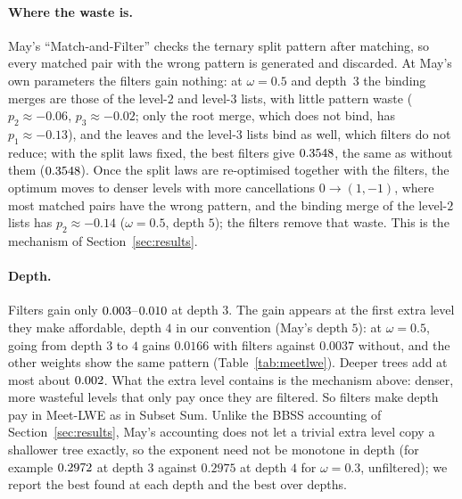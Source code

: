 \begin{table}[ht]
\centering\small
\setlength{\tabcolsep}{4pt}
\caption{Meet-LWE (Rep-1) time exponents $\log_2(T)/n$, asymptotic, guessing ignored. ``May'' is~\cite[Table~5]{May21};
``May, re-opt.'' is his Rep-1 formulas re-optimised over his depths $4$--$6$. The columns $d=3$ and $d=4$ give our best
points found at that depth, unfiltered / filtered; the last columns give the best found over $d=3,\dots,7$, with the
smallest depth attaining it. The gain is unfiltered minus filtered, both best over depths.}
\label{tab:meetlwe}
\end{table}

\paragraph{Where the waste is.} May's ``Match-and-Filter'' checks the ternary split pattern after matching, so every
matched pair with the wrong pattern is generated and discarded. At May's own parameters the filters gain nothing: at
$\omega=0.5$ and depth~$3$ the binding merges are those of the level-$2$ and level-$3$ lists, with little pattern
waste ($p_2\approx-0.06$, $p_3\approx-0.02$; only the root merge, which does not bind, has $p_1\approx-0.13$), and the
leaves and the level-$3$ lists bind as well, which filters do not reduce; with the split laws fixed, the best filters give
$0.3548$, the same as without them ($0.3548$). Once the split laws are re-optimised together with the filters, the optimum moves to
denser levels with more cancellations $0\to(1,-1)$, where most matched pairs have the wrong pattern, and the binding
merge of the level-$2$ lists has $p_2\approx-0.14$ ($\omega=0.5$, depth $5$); the filters remove that waste. This is
the mechanism of Section~\ref{sec:results}.

\paragraph{Depth.} Filters gain only $0.003$--$0.010$ at depth $3$. The gain appears at the first extra
level they make affordable, depth $4$ in our convention (May's depth $5$): at $\omega=0.5$, going from depth $3$ to $4$
gains $0.0166$ with filters against $0.0037$ without, and the other weights show the same pattern
(Table~\ref{tab:meetlwe}). Deeper trees add at most about $0.002$. What the extra level contains is the mechanism
above: denser, more wasteful levels that only pay once they are filtered. So filters make depth pay in Meet-LWE as in
Subset Sum. Unlike the BBSS accounting of Section~\ref{sec:results}, May's accounting does not let a trivial extra
level copy a shallower tree exactly, so the exponent need not be monotone in depth (for example $0.2972$ at depth $3$
against $0.2975$ at depth $4$ for $\omega=0.3$, unfiltered); we report the best found at each depth and the best over
depths.

